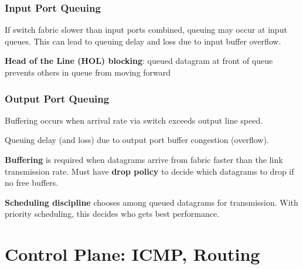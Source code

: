 \documentclass[11pt]{article}
\begin{document}
\subsubsection{Input Port Queuing}
\label{sec:orge34b70b}
If switch fabric slower than input ports combined, queuing may occur at input queues.
This can lead to queuing delay and loss due to input buffer overflow.

\textbf{Head of the Line (HOL) blocking}: queued datagram at front of queue prevents others
in queue from moving forward
\subsubsection{Output Port Queuing}
\label{sec:org1834fa9}
Buffering occurs when arrival rate via switch exceeds output line speed.

Queuing delay (and loss) due to output port buffer congestion (overflow).

\textbf{Buffering} is required when datagrams arrive from fabric faster than the link
transmission rate.
Must have \textbf{drop policy} to decide which datagrams to drop if no free buffers.

\textbf{Scheduling discipline} chooses among queued datagrams for transmission.
With priority scheduling, this decides who gets best performance.
\section{Control Plane: ICMP, Routing}
\label{sec:org472fb45}
\end{document}
